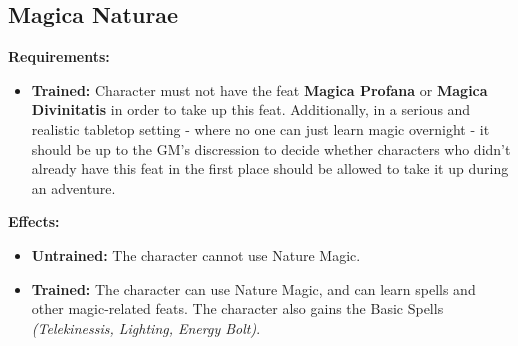 \subsection{Magica Naturae}
\begin{table}[!ht]
\centering
{}
\end{table}
\textbf{Requirements:}
\begin{itemize}
	\item \textbf{Trained:} Character must not have the feat \textbf{Magica Profana} or \textbf{Magica Divinitatis} in order to take up this feat. Additionally, in a serious and realistic tabletop setting - where no one can just learn magic overnight - it should be up to the GM's discression to decide whether characters who didn't already have this feat in the first place should be allowed to take it up during an adventure.
\end{itemize}
\textbf{Effects:}
\begin{itemize}
	\item \textbf{Untrained:} The character cannot use Nature Magic.
	\item \textbf{Trained:} The character can use Nature Magic, and can learn spells and other magic-related feats. The character also gains the Basic Spells \textit{(Telekinessis, Lighting, Energy Bolt)}.
\end{itemize}\newpage
